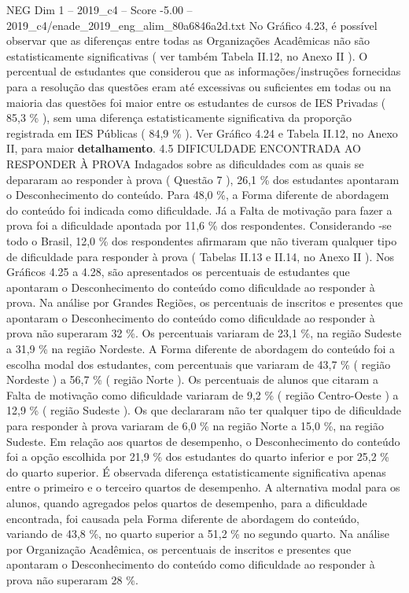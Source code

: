 \begin{textsample}{NEG Dim 1 – 2019\_c4 – Score -5.00 – 2019\_c4/enade\_2019\_eng\_alim\_80a6846a2d.txt}
No Gráfico 4.23, é possível observar que as diferenças entre todas as Organizações Acadêmicas não são estatisticamente significativas ( ver também Tabela II.12, no Anexo II ).
O percentual de estudantes que considerou que as informações/instruções fornecidas para a resolução das questões eram até excessivas ou suficientes em todas ou na maioria das questões foi maior entre os estudantes de cursos de IES Privadas ( 85,3 \% ), sem uma diferença estatisticamente significativa da proporção registrada em IES Públicas ( 84,9 \% ).
Ver Gráfico 4.24 e Tabela II.12, no Anexo II, para maior \textbf{detalhamento}. 4.5 DIFICULDADE ENCONTRADA AO RESPONDER À PROVA Indagados sobre as dificuldades com as quais se depararam ao responder à prova ( Questão 7 ), 26,1 \% dos estudantes apontaram o Desconhecimento do conteúdo.
Para 48,0 \%, a Forma diferente de abordagem do conteúdo foi indicada como dificuldade.
Já a Falta de motivação para fazer a prova foi a dificuldade apontada por 11,6 \% dos respondentes.
Considerando -se todo o Brasil, 12,0 \% dos respondentes afirmaram que não tiveram qualquer tipo de dificuldade para responder à prova ( Tabelas II.13 e II.14, no Anexo II ).
Nos Gráficos 4.25 a 4.28, são apresentados os percentuais de estudantes que apontaram o Desconhecimento do conteúdo como dificuldade ao responder à prova.
Na análise por Grandes Regiões, os percentuais de inscritos e presentes que apontaram o Desconhecimento do conteúdo como dificuldade ao responder à prova não superaram 32 \%.
Os percentuais variaram de 23,1 \%, na região Sudeste a 31,9 \% na região Nordeste.
A Forma diferente de abordagem do conteúdo foi a escolha modal dos estudantes, com percentuais que variaram de 43,7 \% ( região Nordeste ) a 56,7 \% ( região Norte ).
Os percentuais de alunos que citaram a Falta de motivação como dificuldade variaram de 9,2 \% ( região Centro-Oeste ) a 12,9 \% ( região Sudeste ).
Os que declararam não ter qualquer tipo de dificuldade para responder à prova variaram de 6,0 \% na região Norte a 15,0 \%, na região Sudeste.
Em relação aos quartos de desempenho, o Desconhecimento do conteúdo foi a opção escolhida por 21,9 \% dos estudantes do quarto inferior e por 25,2 \% do quarto superior.
É observada diferença estatisticamente significativa apenas entre o primeiro e o terceiro quartos de desempenho.
A alternativa modal para os alunos, quando agregados pelos quartos de desempenho, para a dificuldade encontrada, foi causada pela Forma diferente de abordagem do conteúdo, variando de 43,8 \%, no quarto superior a 51,2 \% no segundo quarto.
Na análise por Organização Acadêmica, os percentuais de inscritos e presentes que apontaram o Desconhecimento do conteúdo como dificuldade ao responder à prova não superaram 28 \%.

\end{textsample}
